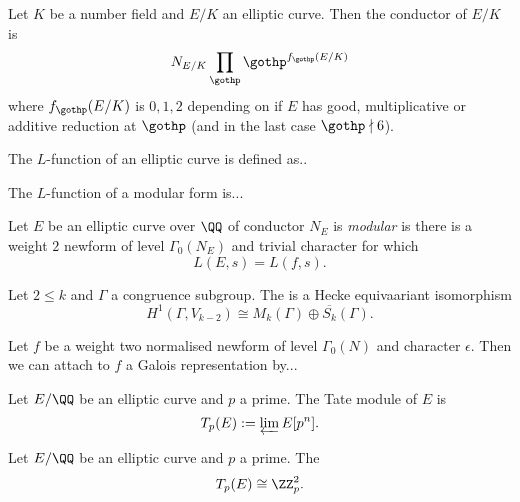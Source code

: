 \begin{definition}\label{defn:ell_curve_conductor}
	Let $K$ be a number field and $E/K$ an elliptic curve. Then the conductor of $E/K$ is $$N_{E/K} \prod_{\gothp} \gothp^{f_{\gothp}(E/K)}$$ where $f_{\gothp}(E/K)$ is $0,1,2$ depending on if $E$ has good, multiplicative or additive reduction at $\gothp$ (and in the last case $\gothp \nmid 6$). 

\end{definition}

\begin{definition}\label{defn:ell_curve_L_fn}
	The $L$-function of an elliptic curve is defined as..
\end{definition}

\begin{definition}\label{defn:mod_form_L_fn}
	The $L$-function of a modular form is...
\end{definition}


\begin{definition}\label{defn:L_fn_modularity}
	Let $E$ be an elliptic curve over $\QQ$ of conductor $N_E$ is \emph{modular} is there is a weight $2$ newform of level $\Gamma_0(N_E)$ and trivial character for which 
	\[L(E,s)= L(f,s).\]
	
\end{definition}	

\begin{theorem}\label{thm:eichler_shimura}
	Let $2 \leq k$ and $\Gamma$ a congruence subgroup.
	The is a Hecke equivaariant isomorphism $$H^1(\Gamma, V_{k-2}) \cong M_k(\Gamma) \oplus \overline{S_k}(\Gamma).$$
\end{theorem}

\begin{definition}\label{defn:mod_form_gal_rep}
	Let $f$ be a weight two normalised newform of level $\Gamma_0(N)$ and character $\epsilon$. Then we can attach to $f$ a Galois representation by...
\end{definition}

\begin{definition}\label{defn:Tate_mod}
	Let $E/\QQ$ be an elliptic curve  and $p$ a prime. The Tate module of $E$ is $$T_p(E) := \varprojlim E[p^n].$$
\end{definition}

\begin{lemma}
	\label{lem:tate_mod_iso}
		Let $E/\QQ$ be an elliptic curve  and $p$ a prime. The $$T_p(E) \cong \ZZ_p^2.$$ 
\end{lemma}

